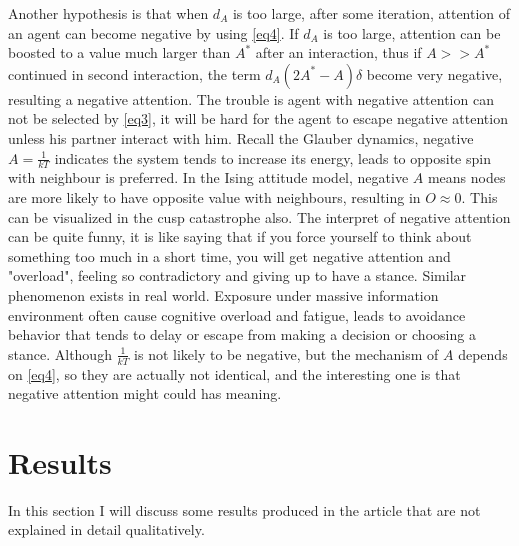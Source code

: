 \documentclass{article}
\begin{document}
Another hypothesis is that when $d_A$ is too large, after some iteration, attention of an agent can become negative by using \autoref{eq4}. If $d_A$ is too large, attention can be boosted to a value much larger
than $A^*$ after an interaction, thus if $A>>A^*$ continued in second interaction, the term $d_A(2A^*-A)\delta$ become very negative, resulting a negative attention. The trouble is agent with negative attention can not be selected by \autoref{eq3}, it will be hard for the agent to escape negative attention unless his partner interact with him. Recall the Glauber dynamics, negative $A=\frac{1}{kT}$ indicates the system tends to increase its energy, leads to opposite spin with neighbour is preferred. 
In the Ising attitude model, negative $A$ means nodes are more likely to have opposite value with neighbours, resulting in $O\approx0$. This can be visualized in the cusp catastrophe also. The interpret of negative attention can be quite funny, 
it is like saying that if you force yourself to think about something too much in a short time, you will get negative attention and "overload", feeling so contradictory and giving up to have a stance. Similar phenomenon exists in real world. Exposure under massive information environment often cause cognitive overload and fatigue, leads to avoidance behavior that tends to delay or escape from making a decision or choosing a stance\cite{da2023cognitive,pilli2016information}. Although $\frac{1}{kT}$ is not likely to be negative,
but the mechanism of $A$ depends on \autoref{eq4}, so they are actually not identical, and the interesting one is that negative attention might could has meaning.
\section{Results}
In this section I will discuss some results produced in the article that are not explained in detail qualitatively.
\end{document}
